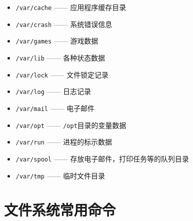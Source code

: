 \documentclass[doctor,openright,twoside]{sjtuthesis}
\providecommand{\tightlist}{%
    \setlength{\itemsep}{0pt}\setlength{\parskip}{0pt}}
\newcommand{\passthrough}[1]{#1}
\theoremstyle{plain}
\theoremstyle{definition}
\theoremstyle{remark}
\theoremstyle{ocrenumbox}
\theoremstyle{plain}
\begin{document}
\begin{itemize}
  \begin{itemize}
  \tightlist
  \item
    \passthrough{\lstinline!/var/cache!} ------ 应用程序缓存目录
  \item
    \passthrough{\lstinline!/var/crash!} ------ 系统错误信息
  \item
    \passthrough{\lstinline!/var/games!} ------ 游戏数据
  \item
    \passthrough{\lstinline!/var/lib!} ------ 各种状态数据
  \item
    \passthrough{\lstinline!/var/lock!} ------ 文件锁定记录
  \item
    \passthrough{\lstinline!/var/log!} ------ 日志记录
  \item
    \passthrough{\lstinline!/var/mail!} ------ 电子邮件
  \item
    \passthrough{\lstinline!/var/opt!} ------
    \passthrough{\lstinline!/opt!}目录的变量数据
  \item
    \passthrough{\lstinline!/var/run!} ------ 进程的标示数据
  \item
    \passthrough{\lstinline!/var/spool!} ------
    存放电子邮件，打印任务等的队列目录
  \item
    \passthrough{\lstinline!/var/tmp!} ------ 临时文件目录
  \end{itemize}
\end{itemize}

\section{文件系统常用命令}
\end{document}

